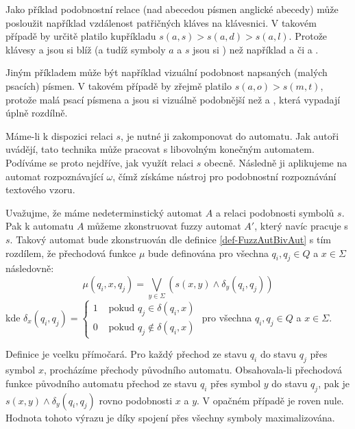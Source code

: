 \documentclass[a4paper,10pt]{article}
\begin{document}
\begin{example}
 Jako příklad podobnostní relace (nad abecedou písmen anglické abecedy) může posloužit například vzdálenost patřičných kláves na klávesnici. V takovém případě by určitě platilo kupříkladu $s(a,s) > s(a, d) > s(a, l)$. Protože klávesy  a  jsou si blíž (a tudíž symboly $a$ a $s$ jsou si ) než například  a  či  a .
 
 Jiným příkladem může být například vizuální podobnost napsaných (malých psacích) písmen. V takovém případě by zřejmě platilo $s(a, o) > s(m, t)$, protože malá psací písmena  a  jsou si vizuálně podobnější než  a , která vypadají úplně rozdílně.
\end{example}

Máme-li k dispozici relaci $s$, je nutné ji zakomponovat do automatu. Jak autoři uvádějí, tato technika může pracovat s libovolným konečným automatem. Podíváme se proto nejdříve, jak využít relaci $s$ obecně. Následně ji aplikujeme na automat rozpoznávající $\omega$, čímž získáme nástroj pro podobnostní rozpoznávání textového vzoru.

\begin{definition} \label{def-AutPracGS}
Uvažujme, že máme nedeterminstický automat $A$ a relaci podobnosti symbolů $s$. Pak k automatu $A$ můžeme zkonstruovat fuzzy automat $A'$, který navíc pracuje s $s$. Takový automat bude zkonstruován dle definice \ref{def-FuzzAutBivAut} s tím rozdílem, že přechodová funkce $\mu$ bude definována pro všechna $q_i, q_j \in Q$ a $x \in \Sigma$ následovně:
$$
 \mu(q_i, x, q_j) = \bigvee_{y \in \Sigma} (s (x, y) \wedge \delta_y (q_i, q_j))
$$
 kde $\delta_x(q_i, q_j) = 
  \begin{cases}
   1 & \text{ pokud } q_j \in \delta(q_i, x)		\\
   0 & \text{ pokud } q_j \notin \delta(q_i, x)
  \end{cases}
 $ pro všechna $q_i, q_j \in Q$ a $x \in \Sigma$.
\end{definition}

Definice je vcelku přímočará. Pro každý přechod ze stavu $q_i$ do stavu $q_j$ přes symbol $x$, procházíme přechody původního automatu. Obsahovala-li přechodová funkce původního automatu přechod ze stavu $q_i$ přes symbol $y$ do stavu $q_j$, pak je $s (x, y) \wedge \delta_y (q_i, q_j)$ rovno podobnosti $x$ a $y$. V opačném případě je roven nule. Hodnota tohoto výrazu je díky spojení přes všechny symboly maximalizována.
\end{document}
